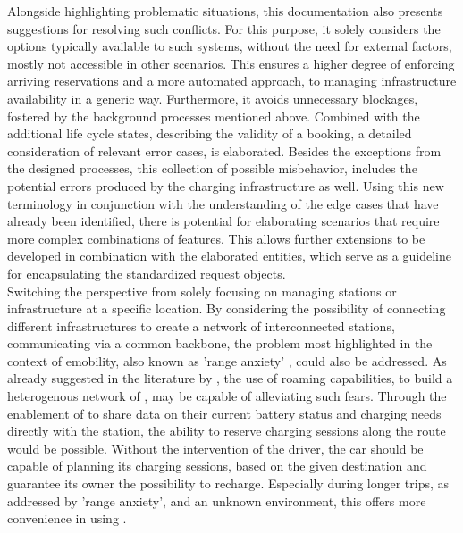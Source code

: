 Alongside highlighting problematic situations, this documentation also presents suggestions for resolving such conflicts. 
For this purpose, it solely considers the options typically available to such systems, without the need for external factors, mostly not accessible in other scenarios.
This ensures a higher degree of enforcing arriving reservations and a more automated approach, to managing infrastructure availability in a generic way. 
Furthermore, it avoids unnecessary blockages, fostered by the background processes mentioned above. 
Combined with the additional life cycle states, describing the validity of a booking, a detailed consideration of relevant error cases, is elaborated.
Besides the exceptions from the designed processes, this collection of possible misbehavior, includes the potential errors produced by the charging infrastructure as well. 
Using this new terminology in conjunction with the understanding of the edge cases that have already been identified, there is potential for elaborating scenarios that require more complex combinations of features.
This allows further extensions to be developed in combination with the elaborated entities, which serve as a guideline for encapsulating the standardized request objects. \\
\noindent Switching the perspective from solely focusing on managing stations or infrastructure at a specific location. 
By considering the possibility of connecting different infrastructures to create a network of interconnected stations, communicating via a common backbone, the problem most highlighted in the context of \acrshort{emobility}, also known as 'range anxiety' \cite{rauh_understanding_2015}, could also be addressed.
As already suggested in the literature by \cite{zarkeshev_charging_2018}, the use of roaming capabilities, to build a heterogenous network of , may be capable of alleviating such fears.
Through the enablement of  to share data on their current battery status and charging needs directly with the station, the ability to reserve charging sessions along the route would be possible.
Without the intervention of the driver, the car should be capable of planning its charging sessions, based on the given destination and guarantee its owner the possibility to recharge.
Especially during longer trips, as addressed by 'range anxiety', and an unknown environment, this offers more convenience in using . 
